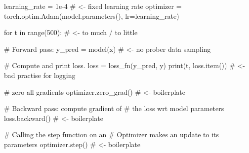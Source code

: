 \documentclass{beamer}
\begin{document}
\begin{frame}[fragile ]
\begin{pythoncode}
learning_rate = 1e-4         # <- fixed learning rate
optimizer = torch.optim.Adam(model.parameters(), lr=learning_rate)

for t in range(500):         # <- to much / to little 

  # Forward pass: 
  y_pred = model(x)         # <- no prober data sampling

  # Compute and print loss.
  loss = loss_fn(y_pred, y)
  print(t, loss.item())     # <- bad practise for logging
  
  # zero all gradients
  optimizer.zero_grad()     # <- boilerplate

  # Backward pass: compute gradient of 
  # the loss wrt model parameters
  loss.backward()           # <- boilerplate

  # Calling the step function on an 
  # Optimizer makes an update to its parameters
  optimizer.step()          # <- boilerplate
\end{pythoncode}
\end{frame}







\end{document}
